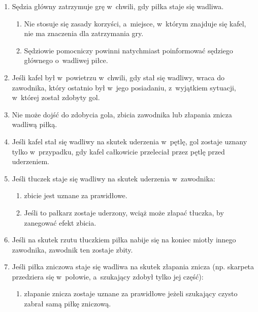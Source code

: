 \documentclass[12pt]{article}
\begin{document}
\begin{enumerate}
	\item Sędzia główny zatrzymuje grę w~chwili, gdy piłka staje się wadliwa.

	      \begin{enumerate}
		      \item Nie stosuje się zasady korzyści, a~miejsce, w~którym znajduje się
		            kafel, nie ma znaczenia dla zatrzymania gry.

		      \item Sędziowie pomocniczy powinni natychmiast poinformować sędziego
		            głównego o~wadliwej piłce.
	      \end{enumerate}

	\item Jeśli kafel był w~powietrzu w~chwili, gdy stał się wadliwy, wraca do
	      zawodnika, który ostatnio był w~jego posiadaniu, z~wyjątkiem sytuacji, w~której został zdobyty gol.

	\item Nie może dojść do zdobycia gola, zbicia zawodnika lub złapania znicza
	      wadliwą piłką.

	\item Jeśli kafel stał się wadliwy na skutek uderzenia w~pętlę, gol zostaje
	      uznany tylko w~przypadku, gdy kafel całkowicie przeleciał przez pętlę
	      przed uderzeniem.

	\item Jeśli tłuczek staje się wadliwy na skutek uderzenia w~zawodnika:
	      \begin{enumerate}
		      \item zbicie jest uznane za prawidłowe.

		      \item Jeśli to pałkarz zostaje uderzony, wciąż może złapać tłuczka, by
		            zanegować efekt zbicia.
	      \end{enumerate}

	\item Jeśli na skutek rzutu tłuczkiem piłka nabije się na koniec miotły
	      innego zawodnika, zawodnik ten zostaje zbity.

	\item Jeśli piłka zniczowa staje się wadliwa na skutek złapania znicza (np.
	      skarpeta przedziera się w~połowie, a~szukający zdobył tylko jej część):
	      \begin{enumerate}
		      \item złapanie znicza zostaje uznane za prawidłowe jeżeli szukający czysto
		            zabrał samą piłkę zniczową.


\end{enumerate}
\end{enumerate}
\end{document}
